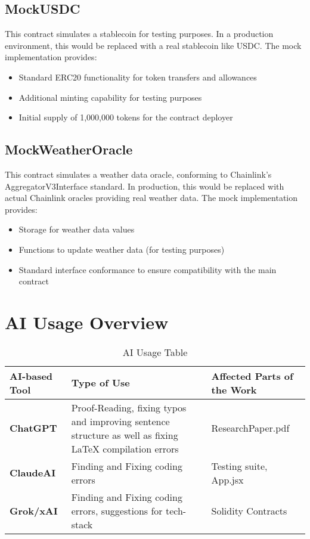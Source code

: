\documentclass[11pt,a4paper]{article}
\begin{document}
		\subsection{MockUSDC}\label{subsec:analysis-mock-usdc}
		This contract simulates a stablecoin for testing purposes.
		In a production environment, this would be replaced with a real stablecoin like USDC. The mock implementation provides:

		\begin{itemize}
			\item Standard ERC20 functionality for token transfers and allowances
			\item Additional minting capability for testing purposes
			\item Initial supply of 1,000,000 tokens for the contract deployer
		\end{itemize}

		\subsection{MockWeatherOracle}\label{subsec:analysis-mock-weather-oracle}
		This contract simulates a weather data oracle, conforming to Chainlink's AggregatorV3Interface standard.
		In production, this would be replaced with actual Chainlink oracles providing real weather data.
		The mock implementation provides:

		\begin{itemize}
			\item Storage for weather data values
			\item Functions to update weather data (for testing purposes)
			\item Standard interface conformance to ensure compatibility with the main contract
		\end{itemize}

        \section{AI Usage Overview}\label{sec:AI-Usage}

        \begin{table}[htbp]
            \centering
            \caption{AI Usage Table}
            \label{tab:AI-usage}
            \begin{tabular}{|p{}|p{}|p{}|}
                \hline
                \textbf{AI-based Tool} & \textbf{Type of Use} & \textbf{Affected Parts of the Work} \\
                \hline
                \textbf{ChatGPT} & Proof-Reading, fixing typos and improving sentence structure as well as fixing LaTeX compilation errors & ResearchPaper.pdf \\
                \hline
                \textbf{ClaudeAI} & Finding and Fixing coding errors & Testing suite, App.jsx \\
                \hline
                \textbf{Grok/xAI} & Finding and Fixing coding errors, suggestions for tech-stack & Solidity Contracts \\
                \hline
            \end{tabular}
        \end{table}


	
\end{document}

